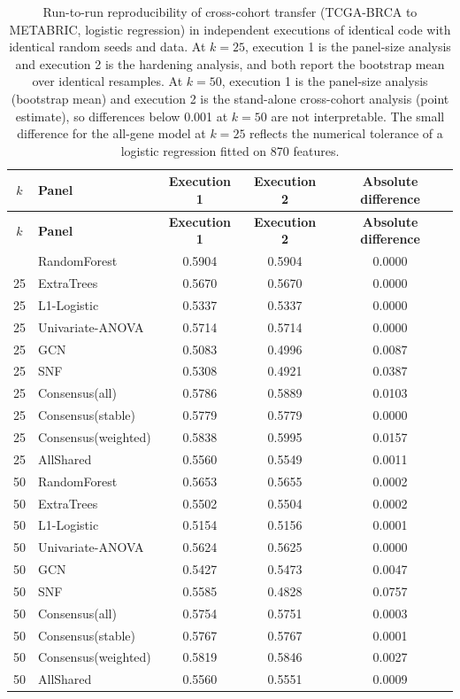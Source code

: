 \documentclass[utf8]{frontiers_suppmat}
\begin{document}
\begin{longtable}{clccc}
\caption{Run-to-run reproducibility of cross-cohort transfer (TCGA-BRCA to METABRIC, logistic regression) in independent executions of identical code with identical random seeds and data. At $k = 25$, execution 1 is the panel-size analysis and execution 2 is the hardening analysis, and both report the bootstrap mean over identical resamples. At $k = 50$, execution 1 is the panel-size analysis (bootstrap mean) and execution 2 is the stand-alone cross-cohort analysis (point estimate), so differences below 0.001 at $k = 50$ are not interpretable. The small difference for the all-gene model at $k = 25$ reflects the numerical tolerance of a logistic regression fitted on 870 features.}\label{tab:S4}\\
\hline
\textbf{$k$} & \textbf{Panel} & \textbf{Execution 1} & \textbf{Execution 2} & \textbf{Absolute difference} \\
\hline
\endfirsthead
\hline
\textbf{$k$} & \textbf{Panel} & \textbf{Execution 1} & \textbf{Execution 2} & \textbf{Absolute difference} \\
\hline
\endhead
\hline
\endfoot
25 & RandomForest & 0.5904 & 0.5904 & 0.0000 \\
25 & ExtraTrees & 0.5670 & 0.5670 & 0.0000 \\
25 & L1-Logistic & 0.5337 & 0.5337 & 0.0000 \\
25 & Univariate-ANOVA & 0.5714 & 0.5714 & 0.0000 \\
25 & GCN & 0.5083 & 0.4996 & 0.0087 \\
25 & SNF & 0.5308 & 0.4921 & 0.0387 \\
25 & Consensus(all) & 0.5786 & 0.5889 & 0.0103 \\
25 & Consensus(stable) & 0.5779 & 0.5779 & 0.0000 \\
25 & Consensus(weighted) & 0.5838 & 0.5995 & 0.0157 \\
25 & AllShared & 0.5560 & 0.5549 & 0.0011 \\
50 & RandomForest & 0.5653 & 0.5655 & 0.0002 \\
50 & ExtraTrees & 0.5502 & 0.5504 & 0.0002 \\
50 & L1-Logistic & 0.5154 & 0.5156 & 0.0001 \\
50 & Univariate-ANOVA & 0.5624 & 0.5625 & 0.0000 \\
50 & GCN & 0.5427 & 0.5473 & 0.0047 \\
50 & SNF & 0.5585 & 0.4828 & 0.0757 \\
50 & Consensus(all) & 0.5754 & 0.5751 & 0.0003 \\
50 & Consensus(stable) & 0.5767 & 0.5767 & 0.0001 \\
50 & Consensus(weighted) & 0.5819 & 0.5846 & 0.0027 \\
50 & AllShared & 0.5560 & 0.5551 & 0.0009 \\
\end{longtable}
\end{document}
